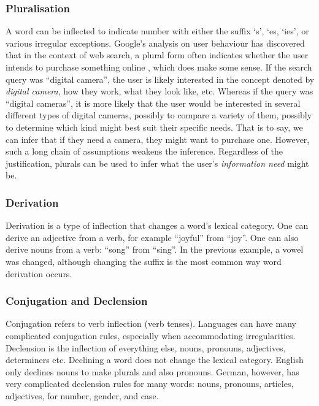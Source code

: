 \subsubsection{Pluralisation}
A word can be inflected to indicate number with either the suffix `s', `es, `ies', or various irregular exceptions. Google's analysis on user behaviour has discovered that in the context of web search, a plural form often indicates whether the user intends to purchase something online \cite{david2006google}, which does make some sense. If the search query was ``digital camera'', the user is likely interested in the concept denoted by \textit{digital camera}, how they work, what they look like, etc. Whereas if the query was ``digital cameras'', it is more likely that the user would be interested in several different types of digital cameras, possibly to compare a variety of them, possibly to determine which kind might best suit their specific needs. That is to say, we can infer that if they need a camera, they might want to purchase one. However, such a long chain of assumptions weakens the inference. Regardless of the justification, plurals can be used to infer what the user's \textit{information need} might be.






\subsubsection{Derivation}
Derivation is a type of inflection that changes a word's lexical category. One can derive an adjective from a verb, for example ``joyful'' from ``joy''. One can also derive nouns from a verb: ``song'' from ``sing''. In the previous example, a vowel was changed, although changing the suffix is the most common way word derivation occurs.

\subsubsection{Conjugation and Declension}
Conjugation refers to verb inflection (verb tenses). Languages can have many complicated conjugation rules, especially when accommodating irregularities. Declension is the inflection of everything else, nouns, pronouns, adjectives, determiners etc. Declining a word does not change the lexical category. English only declines nouns to make plurals and also pronouns. German, however, has very complicated declension rules for many words: nouns, pronouns, articles, adjectives, for number, gender, and case.

